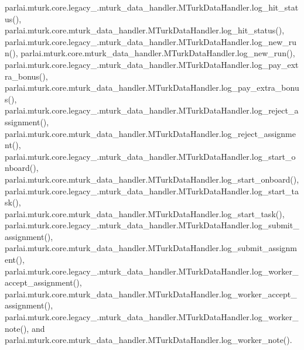 parlai.\+mturk.\+core.\+legacy\+\_.\+mturk\+\_\+data\+\_\+handler.\+M\+Turk\+Data\+Handler.\+log\+\_\+hit\+\_\+status(), parlai.\+mturk.\+core.\+mturk\+\_\+data\+\_\+handler.\+M\+Turk\+Data\+Handler.\+log\+\_\+hit\+\_\+status(), parlai.\+mturk.\+core.\+legacy\+\_.\+mturk\+\_\+data\+\_\+handler.\+M\+Turk\+Data\+Handler.\+log\+\_\+new\+\_\+run(), parlai.\+mturk.\+core.\+mturk\+\_\+data\+\_\+handler.\+M\+Turk\+Data\+Handler.\+log\+\_\+new\+\_\+run(), parlai.\+mturk.\+core.\+legacy\+\_.\+mturk\+\_\+data\+\_\+handler.\+M\+Turk\+Data\+Handler.\+log\+\_\+pay\+\_\+extra\+\_\+bonus(), parlai.\+mturk.\+core.\+mturk\+\_\+data\+\_\+handler.\+M\+Turk\+Data\+Handler.\+log\+\_\+pay\+\_\+extra\+\_\+bonus(), parlai.\+mturk.\+core.\+legacy\+\_.\+mturk\+\_\+data\+\_\+handler.\+M\+Turk\+Data\+Handler.\+log\+\_\+reject\+\_\+assignment(), parlai.\+mturk.\+core.\+mturk\+\_\+data\+\_\+handler.\+M\+Turk\+Data\+Handler.\+log\+\_\+reject\+\_\+assignment(), parlai.\+mturk.\+core.\+legacy\+\_.\+mturk\+\_\+data\+\_\+handler.\+M\+Turk\+Data\+Handler.\+log\+\_\+start\+\_\+onboard(), parlai.\+mturk.\+core.\+mturk\+\_\+data\+\_\+handler.\+M\+Turk\+Data\+Handler.\+log\+\_\+start\+\_\+onboard(), parlai.\+mturk.\+core.\+legacy\+\_.\+mturk\+\_\+data\+\_\+handler.\+M\+Turk\+Data\+Handler.\+log\+\_\+start\+\_\+task(), parlai.\+mturk.\+core.\+mturk\+\_\+data\+\_\+handler.\+M\+Turk\+Data\+Handler.\+log\+\_\+start\+\_\+task(), parlai.\+mturk.\+core.\+legacy\+\_.\+mturk\+\_\+data\+\_\+handler.\+M\+Turk\+Data\+Handler.\+log\+\_\+submit\+\_\+assignment(), parlai.\+mturk.\+core.\+mturk\+\_\+data\+\_\+handler.\+M\+Turk\+Data\+Handler.\+log\+\_\+submit\+\_\+assignment(), parlai.\+mturk.\+core.\+legacy\+\_.\+mturk\+\_\+data\+\_\+handler.\+M\+Turk\+Data\+Handler.\+log\+\_\+worker\+\_\+accept\+\_\+assignment(), parlai.\+mturk.\+core.\+mturk\+\_\+data\+\_\+handler.\+M\+Turk\+Data\+Handler.\+log\+\_\+worker\+\_\+accept\+\_\+assignment(), parlai.\+mturk.\+core.\+legacy\+\_.\+mturk\+\_\+data\+\_\+handler.\+M\+Turk\+Data\+Handler.\+log\+\_\+worker\+\_\+note(), and parlai.\+mturk.\+core.\+mturk\+\_\+data\+\_\+handler.\+M\+Turk\+Data\+Handler.\+log\+\_\+worker\+\_\+note().

\mbox{\label{classparlai_1_1mturk_1_1core_1_1legacy__2018_1_1mturk__data__handler_1_1MTurkDataHandler_ab743471dc641c785f93d9c1285967162}} 
